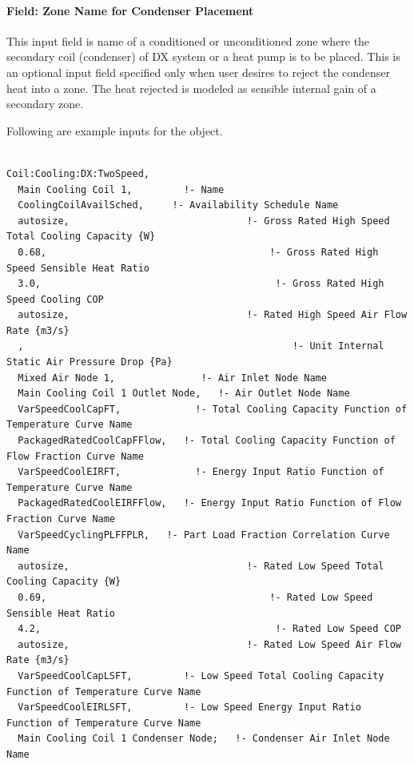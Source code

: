 \paragraph{Field: Zone Name for Condenser Placement}\label{field-zone-name-for-condenser-placement-1}

This input field is name of a conditioned or unconditioned zone where the secondary coil (condenser) of DX system or a heat pump is to be placed. This is an optional input field specified only when user desires to reject the condenser heat into a zone. The heat rejected is modeled as sensible internal gain of a secondary zone.

Following are example inputs for the object.

\begin{lstlisting}

Coil:Cooling:DX:TwoSpeed,
  Main Cooling Coil 1,         !- Name
  CoolingCoilAvailSched,     !- Availability Schedule Name
  autosize,                               !- Gross Rated High Speed Total Cooling Capacity {W}
  0.68,                                       !- Gross Rated High Speed Sensible Heat Ratio
  3.0,                                         !- Gross Rated High Speed Cooling COP
  autosize,                               !- Rated High Speed Air Flow Rate {m3/s}
  ,                                               !- Unit Internal Static Air Pressure Drop {Pa}
  Mixed Air Node 1,               !- Air Inlet Node Name
  Main Cooling Coil 1 Outlet Node,   !- Air Outlet Node Name
  VarSpeedCoolCapFT,             !- Total Cooling Capacity Function of Temperature Curve Name
  PackagedRatedCoolCapFFlow,   !- Total Cooling Capacity Function of Flow Fraction Curve Name
  VarSpeedCoolEIRFT,             !- Energy Input Ratio Function of Temperature Curve Name
  PackagedRatedCoolEIRFFlow,   !- Energy Input Ratio Function of Flow Fraction Curve Name
  VarSpeedCyclingPLFFPLR,   !- Part Load Fraction Correlation Curve Name
  autosize,                               !- Rated Low Speed Total Cooling Capacity {W}
  0.69,                                       !- Rated Low Speed Sensible Heat Ratio
  4.2,                                         !- Rated Low Speed COP
  autosize,                               !- Rated Low Speed Air Flow Rate {m3/s}
  VarSpeedCoolCapLSFT,         !- Low Speed Total Cooling Capacity Function of Temperature Curve Name
  VarSpeedCoolEIRLSFT,         !- Low Speed Energy Input Ratio Function of Temperature Curve Name
  Main Cooling Coil 1 Condenser Node;   !- Condenser Air Inlet Node Name



\end{lstlisting}
